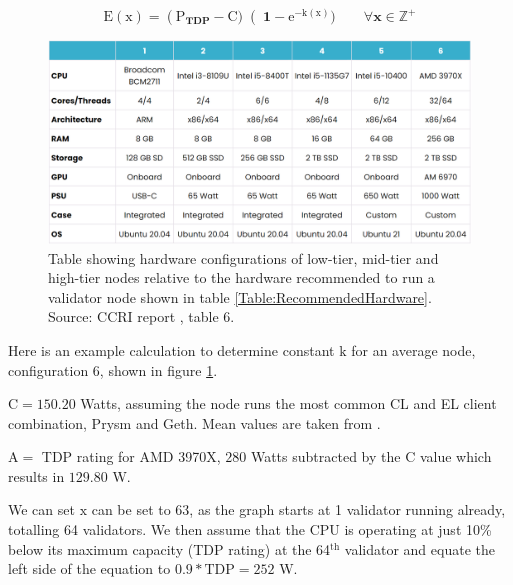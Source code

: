 \begin{equation}
    \label{eqn: ExpDecay}
    \boldsymbol{\mathrm{E(\mathrm{x})} = \left(\mathrm{P}_{TDP} - \mathrm{C} )\right(1-\mathrm{e}^{-\mathrm{k}(\mathrm{x})}) \qquad \forall x \in \mathbb{Z}^+}
\end{equation}


\begin{figure}[htb!]
    \centering
    \includegraphics[width=15cm,center]{Figures/CCRIhardwareConfig.png}
    \caption{Table showing hardware configurations of low-tier, mid-tier and high-tier nodes relative to the hardware recommended to run a validator node shown in table \ref{Table:RecommendedHardware}. Source: CCRI report \cite{CryptoCarbonRatingsInstitute2022TheNetwork}, table 6.}
    \label{Figure:CCRIhardwareConfig}
\end{figure}

Here is an example calculation to determine constant $\boldsymbol{\mathrm{k}}$ for an average node, configuration 6, shown in figure \ref{Figure:CCRIhardwareConfig}. 

$\boldsymbol{\mathrm{C}} = \boldsymbol{\mathrm{150.20}} $ Watts, assuming the node runs the most common CL and EL client combination, Prysm and Geth. Mean values are taken from  \cite{CryptoCarbonRatingsInstitute2022TheNetwork}.

$\boldsymbol{\mathrm{A}} = $ TDP rating for AMD 3970X, $\boldsymbol{\mathrm{280}} $ Watts \cite{AMDDatabase} subtracted by the $\boldsymbol{\mathrm{C}}$ value which results in $\boldsymbol{\mathrm{129.80}}$ W.

We can set $\boldsymbol{\mathrm{x}} $ can be set to $\boldsymbol{\mathrm{63}} $, as the graph starts at 1 validator running already, totalling 64 validators. We then assume that the CPU is operating at just 10\% below its maximum capacity (TDP rating) at the 64$^\mathrm{{th}}$ validator and equate the left side of the equation to $\boldsymbol{\mathrm{0.9 * TDP}} = 252$ W.

